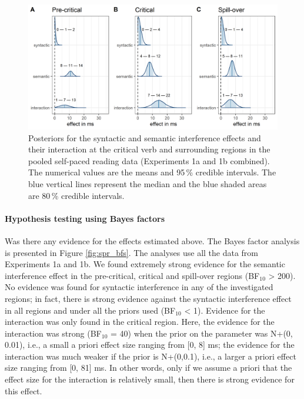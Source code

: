 \documentclass[a4paper, man, floatsintext]{apa7}
\begin{document}
\begin{figure}[H]
    \caption{Posteriors for the syntactic and semantic interference effects and their interaction at the critical verb and surrounding regions in the pooled self-paced reading data (Experiments 1a and 1b combined). The numerical values are the means and 95\,\% credible intervals. The blue vertical lines represent the median and the blue shaded areas are 80\,\% credible intervals.}
    \label{fig:spr_posteriors}
    \centering
    \includegraphics[width=\textwidth]{images/posteriors_spr_pooled_774.png}
\end{figure}

\paragraph{Hypothesis testing using Bayes factors}

Was there any evidence for the effects estimated above.  The Bayes factor analysis is presented in Figure \ref{fig:spr_bfs}. The analyses use all the data from Experiments 1a and 1b. We found extremely strong evidence for the semantic interference effect in the pre-critical, critical and spill-over regions (BF$_{10}$ > 200). No evidence was found for syntactic interference in any of the investigated regions; in fact, there is strong evidence against the syntactic interference effect in all regions and under all the priors used (BF$_{10}$ < 1).  Evidence for the interaction was only found in the critical region. Here, the evidence for the interaction was strong (BF$_{10}$ = 40) when the prior on the parameter was N+(0, 0.01), i.e., a small a priori effect size ranging from  [0, 8] ms; the evidence for the interaction was much weaker if the prior is N+(0,0.1), i.e., a larger a priori effect size ranging from [0, 81] ms. In other words, only if we assume a priori that the effect size for the interaction is relatively small, then there is strong evidence for this effect.
\end{document}
